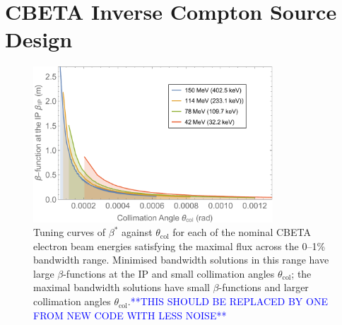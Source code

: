 \documentclass[../main.tex]{subfiles}
\begin{document}
\chapter{CBETA Inverse Compton Source Design}
\label{CBETA_Inverse_Compton_Source_Design} %

\begin{figure}
\centering
\includegraphics[width=0.8\textwidth]{Figures/CBETA_Inverse_Compton_Source_Design/CBETABetaTheta.pdf}
\caption{Tuning curves of $\beta^{*}$ against $\theta_{\mathrm{col}}$ for each of the nominal CBETA electron beam energies satisfying the maximal flux across the 0--1\% bandwidth range. Minimised bandwidth solutions in this range have large $\beta$-functions at the IP and small collimation angles $\theta_{\mathrm{col}}$; the maximal bandwidth solutions have small $\beta$-functions and larger collimation angles $\theta_{\mathrm{col}}$.\textcolor{blue}{**THIS SHOULD BE REPLACED BY ONE FROM NEW CODE WITH LESS NOISE**}}
\label{fig:CBETA_beta_theta_parameter_space}
\end{figure}
\end{document}
